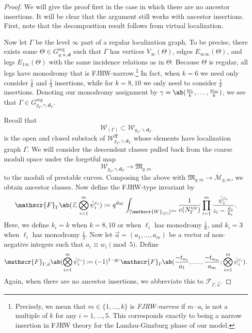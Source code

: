\documentclass[10pt]{amsart}
\theoremstyle{definition}
\theoremstyle{remark}
\theoremstyle{plain}
\theoremstyle{definition}
\theoremstyle{remark}
\newcommand{\bd}{\mathbf{d}}
\newcommand{\msc}[1]{\mathscr{#1}}
\newcommand{\T}{\mathbf{T}}
\newcommand{\mf}[1]{\mathfrak{#1}}
\newcommand{\mr}[1]{\mathrm{#1}}
\newcommand{\on}[1]{\operatorname{#1}}
\newcommand{\ol}[1]{\overline{#1}}
\newcommand{\1}{\mathbf{1}}
\newcommand{\2}{\mathbf{2}}
\newcommand{\3}{\mathbf{3}}
\newcommand{\vir}{\mr{vir}}
\numberwithin{equation}{section}
\begin{document}
\begin{proof}
    We will give the proof first in the case in which there are no ancestor insertions. It will be clear that the argument still works with ancestor insertions. First, note that the decomposition result follows from virtual localization.

Now let $\Gamma$ be the level $\infty$ part of a regular localization graph. To be precise, there exists some $\Theta \in G^{\on{reg}}_{g,n,\bd}$ such that $\Gamma$ has vertices $V_{\infty}(\Theta)$, edges $E_{\infty\infty}(\Theta)$, and legs $E_{1\infty}(\Theta)$ with the same incidence relations as in $\Theta$. Because $\Theta$ is regular, all legs have monodromy that is FJRW-narrow.\footnote{Precisely, we mean that $m \in \{1, \ldots, k\}$ is \textit{FJRW-narrow} if $m \cdot a_i$ is not a multiple of $k$ for any $i=1, \ldots, 5$. This corresponds exactly to being a narrow insertion in FJRW theory for the Landau-Ginzburg phase of our model.} In fact, when $k=6$ we need only consider $\frac{1}{6}$ and $\frac{1}{3}$ insertions, while for $k=8,10$ we only need to consider $\frac{1}{k}$ insertions. Denoting our monodromy assignment by $\gamma = \ab(\frac{w_1}{k}, \ldots, \frac{w_m}{k})$, we see that $\Gamma \in G_{g_{\Gamma}, \gamma, \bd_{\Gamma}}^{\on{reg}}$. 

Recall that 
\[\msc{W}_{(\Gamma)} \subset \msc{W}_{g_{\Gamma}, \gamma, \bd_{\Gamma}} \] 
is the open and closed substack of $\msc{W}_{g_{\Gamma}, \gamma, \bd_{\Gamma}}^{\T}$ whose elements have localization graph $\Gamma$. We will consider the descendent classes pulled back from the coarse moduli space under the forgetful map
\[ \msc{W}_{g_{\Gamma}, \gamma, \bd_{\Gamma}} \to \mf{M}_{g,m} \]
to the moduli of prestable curves. Composing the above with $\mf{M}_{g,m} \to \ol{\msc{M}}_{g,m}$, we obtain ancestor classes. Now define the FJRW-type invariant by
\[ \msc{F}_{\Gamma}\ab(\vec{z},\bigotimes_{i=1}^m \bar{\psi}_i^{c_i}) \coloneqq q^{d_{0 \Gamma}} \int_{[\msc{W}_{(\Gamma)}]^{\vir}} \frac{1}{e(N_{\Gamma}^{\vir})} \prod_{i=1}^m \frac{\bar{\psi}_i^{c_i}}{z_i - \frac{\psi_i}{k_i}}. \]
Here, we define $k_i =k$ when $k=8, 10$ or when $\ell_i$ has monodromy $\frac{1}{6}$, and $k_i = 3$ when $\ell_i$ has monodromy $\frac{1}{3}$. Now let $\vec{a} = (a_1, \ldots, a_m)$ be a vector of non-negative integers such that $a_i \equiv w_i \pmod{5}$. Define
\[ \msc{F}_{\Gamma, \vec{a}}\ab(\bigotimes_{i=1}^m \bar{\psi}_i^{c_i}) \coloneqq (-1)^{1-g_{\Gamma}} \msc{F}_{\Gamma}\ab( \frac{-t_{\alpha_1}}{a_1}, \ldots, \frac{-t_{\alpha_m}}{a_m}; \bigotimes_{i=1}^m \bar{\psi}_i^{c_i}). \]
Again, when there are no ancestor insertions, we abbreviate this to $\msc{F}_{\Gamma, \vec{a}}$.


\end{proof}
\end{document}
